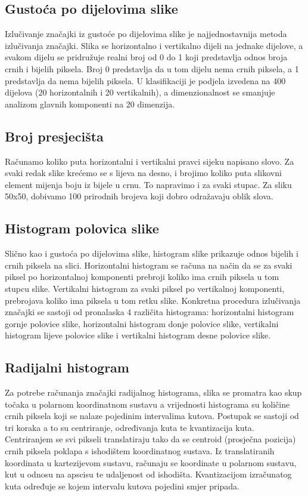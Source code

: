 \documentclass[a4paper,twocolumn,dvipdfm]{article}
\begin{document}
\subsection{Gustoća po dijelovima slike}
Izlučivanje značajki iz gustoće po dijelovima slike je najjednostavnija metoda
izlučivanja značajki. Slika se horizontalno i vertikalno dijeli na jednake
dijelove, a svakom dijelu se pridružuje realni broj od 0 do 1 koji predstavlja
odnos broja crnih i bijelih piksela. Broj 0 predstavlja da u tom dijelu nema
crnih piksela, a 1 predstavlja da nema bijelih piksela. U klasifikaciji je
podjela izvedena na 400 dijelova (20 horizontalnih i 20 vertikalnih), a
dimenzionalnost se smanjuje analizom glavnih komponenti na 20 dimenzija.

\subsection{Broj presjecišta}
Računamo koliko puta horizontalni i vertikalni pravci sijeku napisano slovo.
Za svaki redak slike krećemo se s lijeva na desno, i brojimo koliko puta
slikovni element mijenja boju iz bijele u crnu. To napravimo i za svaki stupac.
Za sliku 50x50, dobivamo 100 prirodnih brojeva koji dobro odražavaju oblik slova.

\subsection{Histogram polovica slike}
Slično kao i gustoća po dijelovima slike, histogram slike prikazuje odnos 
bijelih i crnih piksela na slici. Horizontalni histogram se računa na način 
da se za svaki piksel po horizontalnoj komponenti prebroji koliko ima crnih 
piksela u tom stupcu slike. Vertikalni histogram za svaki piksel po vertikalnoj 
komponenti, prebrojava koliko ima piksela u tom retku slike. Konkretna 
procedura izlučivanja značajki se sastoji od pronalaska 4 različita histograma: 
horizontalni histogram gornje polovice slike, horizontalni histogram donje 
polovice slike, vertikalni histogram lijeve polovice slike i vertikalni 
histogram desne polovice slike.

\subsection{Radijalni histogram}
Za potrebe računanja značajki radijalnog histograma, slika se promatra kao skup
točaka u polarnom koordinatnom sustavu a vrijednosti histograma su količine
crnih piksela koji se nalaze pojedinim intervalima kutova. Postupak se sastoji
od tri koraka a to su centriranje, određivanja kuta te kvantizacija kuta.
Centriranjem se svi pikseli translatiraju tako da se centroid (prosječna
pozicija) crnih piksela poklapa s ishodištem koordinatnog sustava. Iz
translatiranih koordinata u kartezijevom sustavu, računaju se koordinate u
polarnom sustavu, kut u odnosu na apscisu te udaljenost od ishodišta.
Kvantizacijom izračunatog kuta određuje se kojem intervalu kutova pojedini smjer
pripada.
\end{document}
